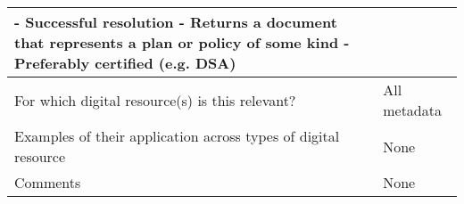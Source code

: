 \documentclass[english]{article}
\begin{document}
\begin{longtable}{|p{5cm}|p{9cm}|}
- Successful resolution\newline 
- Returns a document that represents a plan or policy of some kind\newline 
- Preferably certified (e.g. DSA)\newline 



\\



\hline
For which digital resource(s) is this relevant? &  All metadata\\



\hline
Examples of their application across types of digital resource &  None

\\



\hline

Comments & None 

\\
\hline

\end{longtable}


\newpage
\end{document}

